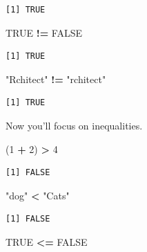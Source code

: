 \documentclass[
]{book}
\newenvironment{Shaded}{\begin{snugshade}}{\end{snugshade}}
\newcommand{\DecValTok}[1]{\textcolor[rgb]{0.00,0.00,0.81}{#1}}
\newcommand{\NormalTok}[1]{#1}
\newcommand{\OperatorTok}[1]{\textcolor[rgb]{0.81,0.36,0.00}{\textbf{#1}}}
\newcommand{\OtherTok}[1]{\textcolor[rgb]{0.56,0.35,0.01}{#1}}
\newcommand{\StringTok}[1]{\textcolor[rgb]{0.31,0.60,0.02}{#1}}
\begin{document}
\begin{verbatim}
[1] TRUE
\end{verbatim}

\begin{Shaded}
\begin{Highlighting}[]
\OtherTok{TRUE} \OperatorTok{!=}\StringTok{ }\OtherTok{FALSE}
\end{Highlighting}
\end{Shaded}

\begin{verbatim}
[1] TRUE
\end{verbatim}

\begin{Shaded}
\begin{Highlighting}[]
\StringTok{"Rchitect"} \OperatorTok{!=}\StringTok{ "rchitect"}
\end{Highlighting}
\end{Shaded}

\begin{verbatim}
[1] TRUE
\end{verbatim}

Now you'll focus on inequalities.

\begin{Shaded}
\begin{Highlighting}[]
\NormalTok{(}\DecValTok{1} \OperatorTok{+}\StringTok{ }\DecValTok{2}\NormalTok{) }\OperatorTok{>}\StringTok{ }\DecValTok{4}
\end{Highlighting}
\end{Shaded}

\begin{verbatim}
[1] FALSE
\end{verbatim}

\begin{Shaded}
\begin{Highlighting}[]
\StringTok{"dog"} \OperatorTok{<}\StringTok{ "Cats"}
\end{Highlighting}
\end{Shaded}

\begin{verbatim}
[1] FALSE
\end{verbatim}

\begin{Shaded}
\begin{Highlighting}[]
\OtherTok{TRUE} \OperatorTok{<=}\StringTok{ }\OtherTok{FALSE}
\end{Highlighting}
\end{Shaded}
\end{document}
